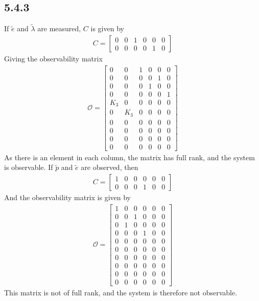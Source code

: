 \subsection*{5.4.3}
If $\tilde{e}$ and $\tilde{\lambda}$ are measured, $C$ is given by
\begin{align*}
C =
\begin{bmatrix}
    0 & 0 & 1 & 0 & 0 & 0\\
    0 & 0 & 0 & 0 & 1 & 0
\end{bmatrix}
\end{align*}
Giving the observability matrix
\begin{align*}
\mathcal{O} =
\begin{bmatrix}
    0 & 0 & 1 & 0 & 0 & 0\\
    0 & 0 & 0 & 0 & 1 & 0\\
    0 & 0 & 0 & 1 & 0 & 0\\
    0 & 0 & 0 & 0 & 0 & 1\\
    K_3 & 0 & 0 & 0 & 0 & 0\\
    0 & K_3 & 0 & 0 & 0 & 0\\
    0 & 0 & 0 & 0 & 0 & 0\\
    0 & 0 & 0 & 0 & 0 & 0\\
    0 & 0 & 0 & 0 & 0 & 0\\
    0 & 0 & 0 & 0 & 0 & 0
\end{bmatrix}
\end{align*}
As there is an element in each column, the matrix has full rank, and the system is observable. If $\tilde{p}$ and $\tilde{e}$ are observed, then
\begin{align*}
C =
\begin{bmatrix}
    1 & 0 & 0 & 0 & 0 & 0\\
    0 & 0 & 0 & 1 & 0 & 0
\end{bmatrix}
\end{align*}
And the observability matrix is given by
\begin{align*}
\mathcal{O} =
\begin{bmatrix}
    1 & 0 & 0 & 0 & 0 & 0\\
    0 & 0 & 1 & 0 & 0 & 0\\
    0 & 1 & 0 & 0 & 0 & 0\\
    0 & 0 & 0 & 1 & 0 & 0\\
    0 & 0 & 0 & 0 & 0 & 0\\
    0 & 0 & 0 & 0 & 0 & 0\\
    0 & 0 & 0 & 0 & 0 & 0\\
    0 & 0 & 0 & 0 & 0 & 0\\
    0 & 0 & 0 & 0 & 0 & 0\\
    0 & 0 & 0 & 0 & 0 & 0
\end{bmatrix}
\end{align*}
This matrix is not of full rank, and the system is therefore not observable.
